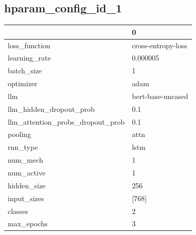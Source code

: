 \documentclass{article}
\begin{document}
\subsection{hparam\_config\_id\_1}
\begin{tabular}{ll}
\toprule
{} &                   0 \\
\midrule
loss\_function                    &  cross-entropy-loss \\
learning\_rate                    &            0.000005 \\
batch\_size                       &                   1 \\
optimizer                        &                adam \\
llm                              &   bert-base-uncased \\
llm\_hidden\_dropout\_prob          &                 0.1 \\
llm\_attention\_probs\_dropout\_prob &                 0.1 \\
pooling                          &                attn \\
rnn\_type                         &                lstm \\
num\_mech                         &                   1 \\
num\_active                       &                   1 \\
hidden\_size                      &                 256 \\
input\_sizes                      &               [768] \\
classes                          &                   2 \\
max\_epochs                       &                   3 \\
\bottomrule
\end{tabular}
\end{document}
